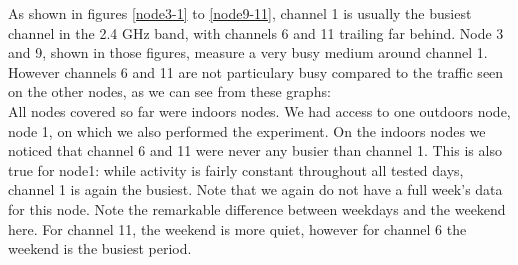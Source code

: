 \documentclass[a4paper, 11pt]{article}
\begin{document}
As shown in figures \ref{node3-1} to \ref{node9-11}, channel 1 is usually the busiest channel in the 2.4 GHz band, with channels 6 and 11 trailing far behind. Node 3 and 9, shown in those figures, measure a very busy medium around channel 1. However channels 6 and 11 are not particulary busy compared to the traffic seen on the other nodes, as we can see from these graphs:\\

\newpage
All nodes covered so far were indoors nodes. We had access to one outdoors node, node 1, on which we also performed the experiment. On the indoors nodes we noticed that channel 6 and 11 were never any busier than channel 1. This is also true for node1: while activity is fairly constant throughout all tested days, channel 1 is again the busiest. Note that we again do not have a full week's data for this node. Note the remarkable difference between weekdays and the weekend here. For channel 11, the weekend is more quiet, however for channel 6 the weekend is the busiest period.
\end{document}
